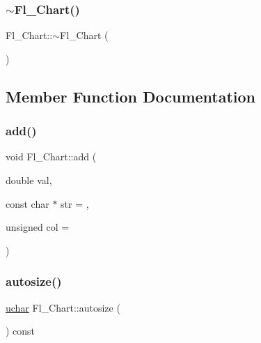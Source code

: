 \mbox{\label{class_fl___chart_ad2001b6183ead9c3db024c877b140a0e}} 
\subsubsection{\texorpdfstring{$\sim$\+Fl\+\_\+\+Chart()}{~Fl\_Chart()}}
{\footnotesize\ttfamily Fl\+\_\+\+Chart\+::$\sim$\+Fl\+\_\+\+Chart (\begin{DoxyParamCaption}{ }\end{DoxyParamCaption})}



\subsection{Member Function Documentation}
\mbox{\label{class_fl___chart_ab45e570b04d13d0c366df960ebfeea20}} 
\subsubsection{\texorpdfstring{add()}{add()}}
{\footnotesize\ttfamily void Fl\+\_\+\+Chart\+::add (\begin{DoxyParamCaption}\item[{double}]{val,  }\item[{const char $\ast$}]{str = {},  }\item[{unsigned}]{col = {} }\end{DoxyParamCaption})}

\mbox{\label{class_fl___chart_aac985068654026812efd7df0d0b5a6ff}} 
\subsubsection{\texorpdfstring{autosize()}{autosize()}\hspace{0.1cm}{\footnotesize\ttfamily [1/2]}}
{\footnotesize\ttfamily \hyperlink{fl__types_8h_a65f85814a8290f9797005d3b28e7e5fc}{uchar} Fl\+\_\+\+Chart\+::autosize (\begin{DoxyParamCaption}{ }\end{DoxyParamCaption}) const\hspace{0.3cm}{\ttfamily [inline]}}

